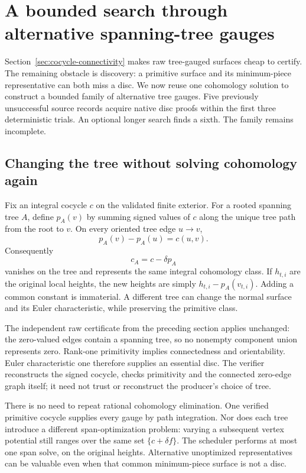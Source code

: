 \section{A bounded search through alternative spanning-tree gauges}
\label{sec:cocycle-trees}

Section~\ref{sec:cocycle-connectivity} makes raw tree-gauged surfaces cheap
to certify. The remaining obstacle is discovery: a primitive surface and
its minimum-piece representative can both miss a disc. We now reuse one
cohomology solution to construct a bounded family of alternative tree
gauges. Five previously unsuccessful source records acquire native disc
proofs within the first three deterministic trials. An optional longer
search finds a sixth. The family remains incomplete.

\subsection{Changing the tree without solving cohomology again}

Fix an integral cocycle $c$ on the validated finite exterior. For a rooted
spanning tree $A$, define $p_A(v)$ by summing signed values of $c$ along
the unique tree path from the root to $v$. On every oriented tree edge
$u\to v$,
\[
 p_A(v)-p_A(u)=c(u,v).
\]
Consequently
\[
 c_A=c-\delta p_A
\]
vanishes on the tree and represents the same integral cohomology class.
If $h_{t,i}$ are the original local heights, the new heights are simply
$h_{t,i}-p_A(v_{t,i})$. Adding a common constant is immaterial. A different
tree can change the normal surface and its Euler characteristic, while
preserving the primitive class.

The independent raw certificate from the preceding section applies
unchanged: the zero-valued edges contain a spanning tree, so no nonempty
component union represents zero. Rank-one primitivity implies connectedness
and orientability. Euler characteristic one therefore supplies an essential
disc. The verifier reconstructs the signed cocycle, checks primitivity and
the connected zero-edge graph itself; it need not trust or reconstruct the
producer's choice of tree.

There is no need to repeat rational cohomology elimination. One verified
primitive cocycle supplies every gauge by path integration. Nor does each
tree introduce a different span-optimization problem: varying a subsequent
vertex potential still ranges over the same set
$\{c+\delta f\}$. The scheduler performs at most one span solve, on the
original heights. Alternative unoptimized representatives can be valuable
even when that common minimum-piece surface is not a disc.

